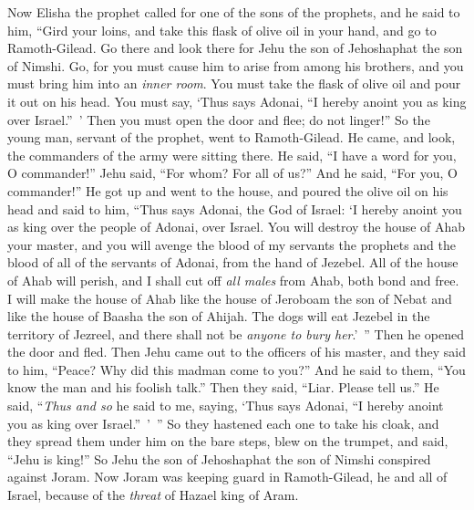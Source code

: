 \begin{biblechapter} %
 Now Elisha the prophet called for one of the sons of the prophets, and he said to him, “Gird your loins, and take this flask of olive oil in your hand, and go to Ramoth-Gilead.
\verse Go there and look there for Jehu the son of Jehoshaphat the son of Nimshi. Go, for you must cause him to arise from among his brothers, and you must bring him into an \textit{inner room}.
\verse You must take the flask of olive oil and pour it out on his head. You must say, ‘Thus says Adonai, “I hereby anoint you as king over Israel.” ’ Then you must open the door and flee; do not linger!”
\verse So the young man, servant of the prophet, went to Ramoth-Gilead.
\verse He came, and look, the commanders of the army were sitting there. He said, “I have a word for you, O commander!” Jehu said, “For whom? For all of us?” And he said, “For you, O commander!”
\verse He got up and went to the house, and poured the olive oil on his head and said to him, “Thus says Adonai, the God of Israel: ‘I hereby anoint you as king over the people of Adonai, over Israel.
\verse You will destroy the house of Ahab your master, and you will avenge the blood of my servants the prophets and the blood of all of the servants of Adonai, from the hand of Jezebel.
\verse All of the house of Ahab will perish, and I shall cut off \textit{all males} from Ahab, both bond and free.
\verse I will make the house of Ahab like the house of Jeroboam the son of Nebat and like the house of Baasha the son of Ahijah.
\verse The dogs will eat Jezebel in the territory of Jezreel, and there shall not be \textit{anyone to bury her}.’ ” Then he opened the door and fled.
 Then Jehu came out to the officers of his master, and they said to him, “Peace? Why did this madman come to you?” And he said to them, “You know the man and his foolish talk.”
\verse Then they said, “Liar. Please tell us.” He said, “\textit{Thus and so} he said to me, saying, ‘Thus says Adonai, “I hereby anoint you as king over Israel.” ’ ”
\verse So they hastened each one to take his cloak, and they spread them under him on the bare steps, blew on the trumpet, and said, “Jehu is king!”
\verse So Jehu the son of Jehoshaphat the son of Nimshi conspired against Joram. Now Joram was keeping guard in Ramoth-Gilead, he and all of Israel, because of the \textit{threat} of Hazael king of Aram.

\end{biblechapter}
